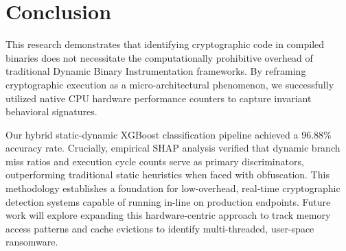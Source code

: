 \documentclass[conference]{IEEEtran}
\begin{document}
\section{Conclusion}
This research demonstrates that identifying cryptographic code in compiled binaries does not necessitate the computationally prohibitive overhead of traditional Dynamic Binary Instrumentation frameworks. By reframing cryptographic execution as a micro-architectural phenomenon, we successfully utilized native CPU hardware performance counters to capture invariant behavioral signatures. 

Our hybrid static-dynamic XGBoost classification pipeline achieved a 96.88\% accuracy rate. Crucially, empirical SHAP analysis verified that dynamic branch miss ratios and execution cycle counts serve as primary discriminators, outperforming traditional static heuristics when faced with obfuscation. This methodology establishes a foundation for low-overhead, real-time cryptographic detection systems capable of running in-line on production endpoints. Future work will explore expanding this hardware-centric approach to track memory access patterns and cache evictions to identify multi-threaded, user-space ransomware.



\end{document}
